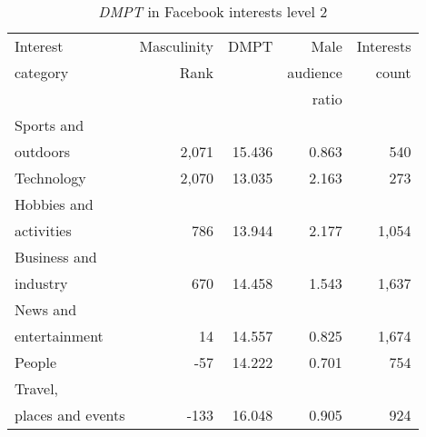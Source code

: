 \documentclass[twocolumn]{bmcart}\usepackage{lineno}
\begin{document}
\begin{backmatter}
















\begin{center}

    \begin{table}[!t]
        \caption{\emph{DMPT} in Facebook interests level 2 
        {\label{tab:CatIgnacio}}}
        \color{blue}
        \begin{tabular}{|l|rrrr|}
\hline
Interest                    &Masculinity           &     DMPT             & Male  & Interests  \\ 
category                    & Rank          &                  & audience  & count  \\ 
                    &       &                           & ratio    &  \\ \hline 
        Sports and  &      &   &              &          \\
        outdoors &      2,071 &  15.436 &             0.863 &         540 \\
                 Technology &      2,070 &  13.035 &             2.163 &         273 \\
     Hobbies and &         &   &              &         \\
     activities &        786 &  13.944 &             2.177 &        1,054 \\
      Business and  &         &  &              &         \\
      industry &        670 &  14.458 &             1.543 &        1,637 \\
     News and  &          &   &              &         \\
     entertainment &         14 &  14.557 &             0.825 &        1,674 \\
                     People &        -57 &  14.222 &             0.701 &         754 \\
  Travel,                    &        &  &              &         \\
  places and events &       -133 &  16.048 &             0.905 &         924 \\

\end{tabular}
\end{table}
\end{center}
\end{backmatter}
\end{document}
